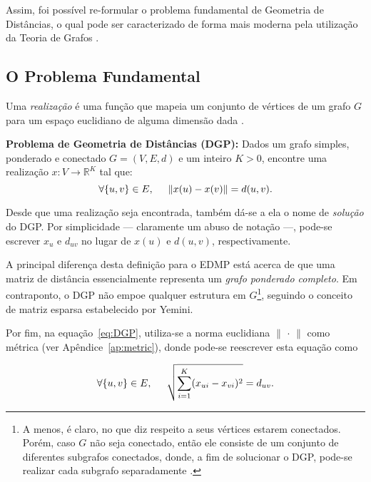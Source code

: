 Assim, foi possível re-formular o problema fundamental de Geometria de Distâncias, o qual pode ser caracterizado de forma mais moderna pela utilização da Teoria de Grafos \cite{carlileGDandAplications}.

\subsection{O Problema Fundamental}

Uma \textit{realização} é uma função que mapeia um conjunto de vértices de um grafo $G$ para um espaço euclidiano de alguma dimensão dada \cite{libertiEDG}.

\begin{center}
	\begin{minipage}{0.9 \linewidth}
		\textbf{Problema de Geometria de Distâncias (DGP):} Dados um grafo simples, ponderado e conectado $G = (V, E, d)$ e um inteiro $K>0$, encontre uma realização $x: V \longrightarrow \mathbb{R}^K$ tal que:
		\begin{equation}
		\forall \{u,v\} \in E, \hspace{0.5cm} \lVert x(u) - x(v) \rVert = d(u,v). \label{eq:DGP}
		\end{equation}
	\end{minipage}
\end{center}

Desde que uma realização seja encontrada, também dá-se a ela o nome de \textit{solução} do DGP. Por simplicidade --- claramente um abuso de notação ---, pode-se escrever $x_u$ e $d_{uv}$ no lugar de $x(u)$ e $d(u,v)$, respectivamente.

A principal diferença desta definição para o EDMP está acerca de que uma matriz de distância essencialmente representa um \textit{grafo ponderado completo}. Em contraponto, o DGP não empoe qualquer estrutura em $G$\footnote{A menos, é claro, no que diz respeito a seus vértices estarem conectados. Porém, caso $G$ não seja conectado, então ele consiste de um conjunto de diferentes subgrafos conectados, donde, a fim de solucionar o DGP, pode-se realizar cada subgrafo separadamente \cite{libertiEDG}.}, seguindo o conceito de matriz esparsa estabelecido por Yemini.

Por fim, na equação~\ref{eq:DGP}, utiliza-se a norma euclidiana $\lVert$ $\cdot$ $\rVert$ como métrica (ver Apêndice~\ref{ap:metric}), donde pode-se reescrever esta equação como

\begin{equation*}
	\forall \{u,v\} \in E, \hspace{0.5cm} \sqrt{\sum_{i=1}^{K}(x_{ui} - x_{vi})^2} = d_{uv}.
\end{equation*}

